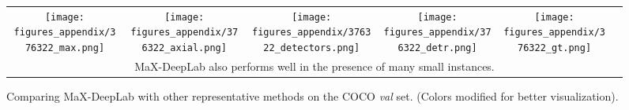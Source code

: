 \begin{figure*}[!p]
{\begin{tabular}{cccccc}
        \texttt{[image: figures\_appendix/376322\_max.png]} &
        \texttt{[image: figures\_appendix/376322\_axial.png]} &
        \texttt{[image: figures\_appendix/376322\_detectors.png]} &
        \texttt{[image: figures\_appendix/376322\_detr.png]} &
        \texttt{[image: figures\_appendix/376322\_gt.png]} \\
        \multicolumn{6}{p{0.98\textwidth}}{\small MaX-DeepLab also performs well in the presence of many small instances.} \\
        \bottomrule[0.1em]
    \end{tabular}}
    \vspace{7pt}
    \caption{Comparing  MaX-DeepLab with other representative methods on the COCO {\it val} set. (Colors modified for better visualization).}
    \label{fig:comparison}
\end{figure*}

